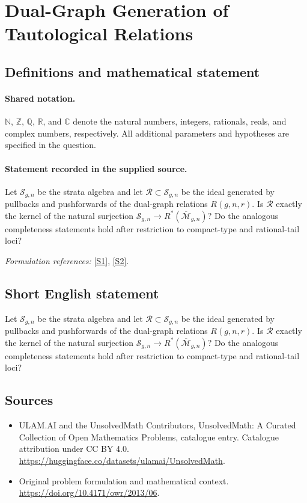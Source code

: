 \documentclass[11pt]{article}
\newcommand{\sref}[2]{\hyperlink{source:#1:#2}{[S#2]}}
\begin{document}
\section{Dual-Graph Generation of Tautological Relations}\label{statement}

\subsection{Definitions and mathematical statement}

\paragraph{Shared notation.}$\mathbb N$, $\mathbb Z$, $\mathbb Q$, $\mathbb R$, and $\mathbb C$ denote the natural numbers, integers, rationals, reals, and complex numbers, respectively. All additional parameters and hypotheses are specified in the question.


\paragraph{Statement recorded in the supplied source.}
Let $\mathcal S_{g,n}$ be the strata algebra and let $\mathcal R\subset\mathcal S_{g,n}$ be the ideal generated by pullbacks and pushforwards of the dual-graph relations $R(g,n,r)$. Is $\mathcal R$ exactly the kernel of the natural surjection $\mathcal S_{g,n}\to R^*(\overline{\mathcal M}_{g,n})$? Do the analogous completeness statements hold after restriction to compact-type and rational-tail loci?
\par\smallskip\textit{Formulation references:} \sref{statement}{1}, \sref{statement}{2}.
\subsection{Short English statement}
Let $\mathcal S_{g,n}$ be the strata algebra and let $\mathcal R\subset\mathcal S_{g,n}$ be the ideal generated by pullbacks and pushforwards of the dual-graph relations $R(g,n,r)$. Is $\mathcal R$ exactly the kernel of the natural surjection $\mathcal S_{g,n}\to R^*(\overline{\mathcal M}_{g,n})$? Do the analogous completeness statements hold after restriction to compact-type and rational-tail loci?
\subsection{Sources}
\begin{itemize}
\item[\hypertarget{source:statement:1}{S1}] ULAM.AI and the UnsolvedMath Contributors, UnsolvedMath: A Curated Collection of Open Mathematics Problems, catalogue entry. Catalogue attribution under CC BY 4.0.
\url{https://huggingface.co/datasets/ulamai/UnsolvedMath}.
\item[\hypertarget{source:statement:2}{S2}] Original problem formulation and mathematical context.
\url{https://doi.org/10.4171/owr/2013/06}.
\end{itemize}
\label{end:statement}
\end{document}
